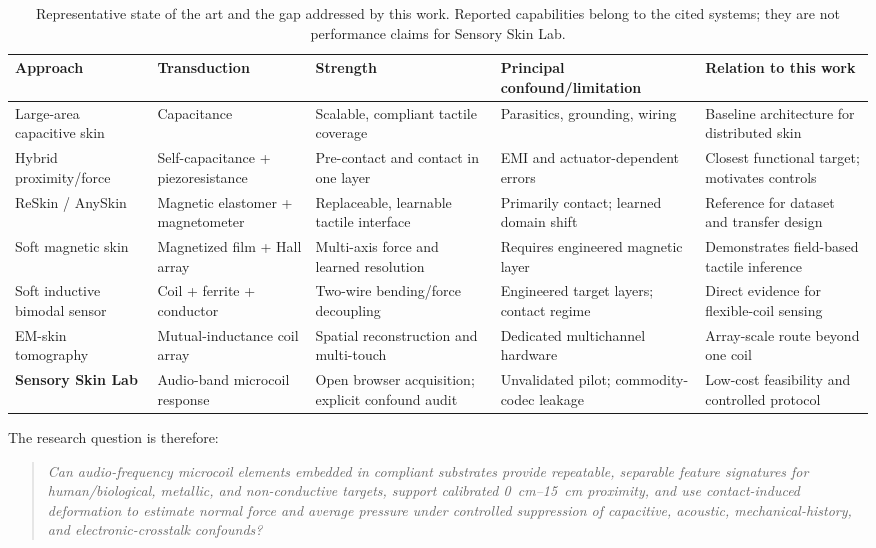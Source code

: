 \documentclass[10pt]{article}
\begin{document}
\begin{table}[t]
\centering\small
\caption{Representative state of the art and the gap addressed by this work. Reported capabilities belong to the cited systems; they are not performance claims for Sensory Skin Lab.}
\label{tab:sota}
\begin{tabularx}{\textwidth}{@{}p{2.2cm}p{2.2cm}X X p{2.4cm}@{}}
\toprule
Approach & Transduction & Strength & Principal confound/limitation & Relation to this work\\
\midrule
Large-area capacitive skin \citep{maiolino2013capacitive} & Capacitance & Scalable, compliant tactile coverage & Parasitics, grounding, wiring & Baseline architecture for distributed skin\\
Hybrid proximity/force \citep{fonseca2023hybrid} & Self-capacitance + piezoresistance & Pre-contact and contact in one layer & EMI and actuator-dependent errors & Closest functional target; motivates controls\\
ReSkin / AnySkin \citep{bhirangi2022reskin,bhirangi2024anyskin} & Magnetic elastomer + magnetometer & Replaceable, learnable tactile interface & Primarily contact; learned domain shift & Reference for dataset and transfer design\\
Soft magnetic skin \citep{yan2021magnetic} & Magnetized film + Hall array & Multi-axis force and learned resolution & Requires engineered magnetic layer & Demonstrates field-based tactile inference\\
Soft inductive bimodal sensor \citep{peng2024inductive} & Coil + ferrite + conductor & Two-wire bending/force decoupling & Engineered target layers; contact regime & Direct evidence for flexible-coil sensing\\
EM-skin tomography \citep{dingley2023emskin} & Mutual-inductance coil array & Spatial reconstruction and multi-touch & Dedicated multichannel hardware & Array-scale route beyond one coil\\
\textbf{Sensory Skin Lab} & Audio-band microcoil response & Open browser acquisition; explicit confound audit & Unvalidated pilot; commodity-codec leakage & Low-cost feasibility and controlled protocol\\
\bottomrule
\end{tabularx}
\end{table}

The research question is therefore:
\begin{quote}
\emph{Can audio-frequency microcoil elements embedded in compliant substrates provide repeatable, separable feature signatures for human/biological, metallic, and non-conductive targets, support calibrated \SIrange{0}{15}{\centi\metre} proximity, and use contact-induced deformation to estimate normal force and average pressure under controlled suppression of capacitive, acoustic, mechanical-history, and electronic-crosstalk confounds?}
\end{quote}
\end{document}
